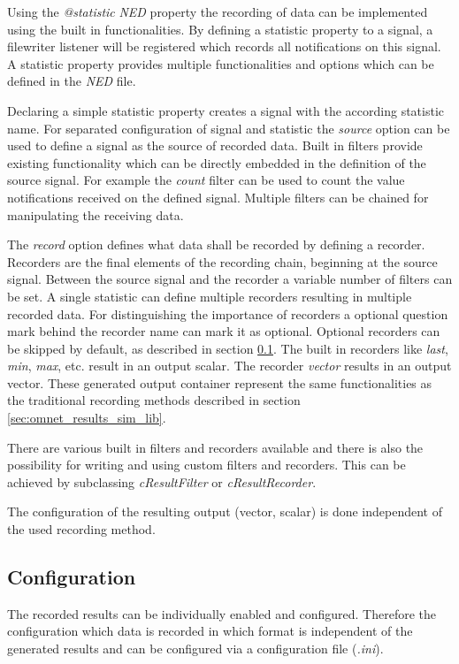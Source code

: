 Using the \emph{@statistic} \emph{NED} property the recording of data can be implemented using the built in functionalities.
By defining a statistic property to a signal, a filewriter listener will be registered which records all notifications on this signal.
A statistic property provides multiple functionalities and options which can be defined in the \emph{NED} file.

Declaring a simple statistic property creates a signal with the according statistic name.
For separated configuration of signal and statistic the \emph{source} option can be used to define a signal as the source of recorded data.
Built in filters provide existing functionality which can be directly embedded in the definition of the source signal.
For example the \emph{count} filter can be used to count the value notifications received on the defined signal.
Multiple filters can be chained for manipulating the receiving data.

The \emph{record} option defines what data shall be recorded by defining a recorder.
Recorders are the final elements of the recording chain, beginning at the source signal.
Between the source signal and the recorder a variable number of filters can be set.
A single statistic can define multiple recorders resulting in multiple recorded data.
For distinguishing the importance of recorders a optional question mark behind the recorder name can mark it as optional.
Optional recorders can be skipped by default, as described in section \ref{sec:omnet_results_config}.
The built in recorders like \emph{last}, \emph{min}, \emph{max}, etc. result in an output scalar.
The recorder \emph{vector} results in an output vector.
These generated output container represent the same functionalities as the traditional recording methods described in section \ref{sec:omnet_results_sim_lib}.

There are various built in filters and recorders available \cite[section 4.15.2]{omnet_manual} and there is also the possibility for writing and using custom filters and recorders. 
This can be achieved by subclassing \emph{cResultFilter} or \emph{cResultRecorder}. \cite[section 4.15.6]{omnet_manual}

The configuration of the resulting output (vector, scalar) is done independent of the used recording method.

\subsection{Configuration}
\label{sec:omnet_results_config}
The recorded results can be individually enabled and configured.
Therefore the configuration which data is recorded in which format is independent of the generated results and can be configured via a configuration file (\emph{.ini}).

